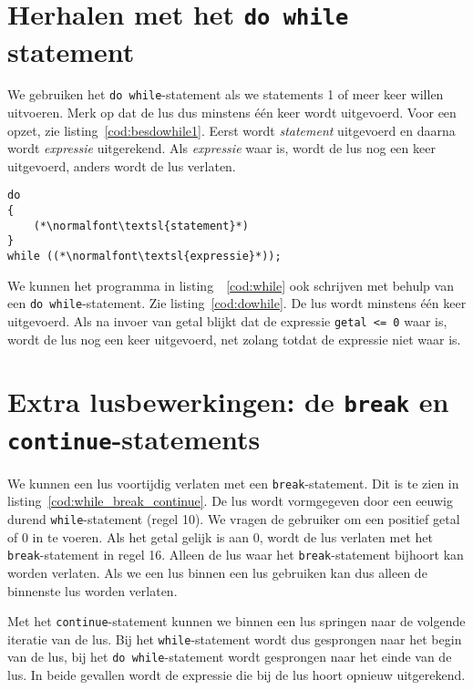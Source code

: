 \section{Herhalen met het \texttt{do while} statement}
We gebruiken het \texttt{do while}-statement als we statements 1 of meer keer willen uitvoeren. Merk op dat de lus dus minstens één keer wordt uitgevoerd. Voor een opzet, zie listing~\ref{cod:besdowhile1}. Eerst wordt \textsl{statement} uitgevoerd en daarna wordt \textsl{expressie} uitgerekend. Als \textsl{expressie} waar is, wordt de lus nog een keer uitgevoerd, anders wordt de lus verlaten.

\begin{lstlisting}[caption=Opzet \texttt{do while}-statement.,label=cod:besdowhile1]
do
{
    (*\normalfont\textsl{statement}*)
}
while ((*\normalfont\textsl{expressie}*));
\end{lstlisting}

We kunnen het programma in listing~~\ref{cod:while} ook schrijven met behulp van een \texttt{do while}-statement. Zie listing~\ref{cod:dowhile}. De lus wordt minstens één keer uitgevoerd. Als na invoer van getal blijkt dat de expressie \texttt{getal <= 0} waar is, wordt de lus nog een keer uitgevoerd, net zolang totdat de expressie niet waar is.
 


\section{Extra lusbewerkingen: de \texttt{break} en \texttt{continue}-statements}
We kunnen een lus voortijdig verlaten met een \texttt{break}-statement. Dit is te zien in listing~\ref{cod:while_break_continue}. De lus wordt vormgegeven door een eeuwig durend \texttt{while}-statement (regel 10). We vragen de gebruiker om een positief getal of 0 in te voeren. Als het getal gelijk is aan 0, wordt de lus verlaten met het \texttt{break}-statement in regel 16. Alleen de lus waar het \texttt{break}-statement bijhoort kan worden verlaten. Als we een lus binnen een lus gebruiken kan dus alleen de binnenste lus worden verlaten.

Met het \texttt{continue}-statement kunnen we binnen een lus springen naar de volgende iteratie van de lus. Bij het \texttt{while}-statement wordt dus gesprongen naar het begin van de lus, bij het \texttt{do while}-statement wordt gesprongen naar het einde van de lus. In beide gevallen wordt de expressie die bij de lus hoort opnieuw uitgerekend.

